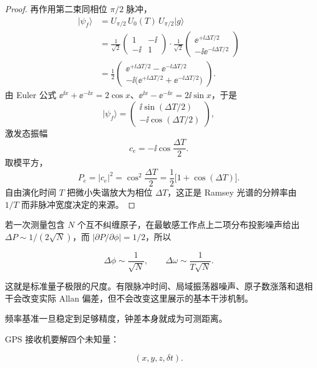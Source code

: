 \begin{proof}
再作用第二束同相位 $\pi/2$ 脉冲，
\begin{align*}
|\psi_f\rangle
&=U_{\pi/2}\,U_0(T)\,U_{\pi/2}|g\rangle \\
&=\frac1{\sqrt2}
\begin{pmatrix}1&-\ii\\-\ii&1\end{pmatrix}
\cdot\frac1{\sqrt2}
\begin{pmatrix}\ee^{+\ii\Delta T/2}\\-\ii\ee^{-\ii\Delta T/2}\end{pmatrix} \\
&=\frac12
\begin{pmatrix}
\ee^{+\ii\Delta T/2}-\ee^{-\ii\Delta T/2}\\
-\ii\bigl(\ee^{+\ii\Delta T/2}+\ee^{-\ii\Delta T/2}\bigr)
\end{pmatrix}.
\end{align*}
由 Euler 公式 $\ee^{\ii x}+\ee^{-\ii x}=2\cos x$、$\ee^{\ii x}-\ee^{-\ii x}=2\ii\sin x$，于是
\begin{equation*}
|\psi_f\rangle
=\begin{pmatrix}
\ii\sin(\Delta T/2)\\
-\ii\cos(\Delta T/2)
\end{pmatrix},
\end{equation*}
激发态振幅
\begin{equation*}
c_e=-\ii\cos\frac{\Delta T}{2}.
\end{equation*}
取模平方，
\begin{equation*}
P_e=|c_e|^2=\cos^2\frac{\Delta T}{2}
=\frac12\bigl[1+\cos(\Delta T)\bigr].
\end{equation*}
自由演化时间 $T$ 把微小失谐放大为相位 $\Delta T$，这正是 Ramsey 光谱的分辨率由 $1/T$ 而非脉冲宽度决定的来源。
\end{proof}

若一次测量包含 \(N\) 个互不纠缠原子，在最敏感工作点上二项分布投影噪声给出 \(\Delta P\sim1/(2\sqrt N)\)，而 \(|\partial P/\partial\phi|=1/2\)，所以

\[
\Delta\phi\sim\frac1{\sqrt N},
\qquad
\Delta\omega\sim\frac1{T\sqrt N}.
\]

这就是标准量子极限的尺度。有限脉冲时间、局域振荡器噪声、原子数涨落和退相干会改变实际 Allan 偏差，但不会改变这里展示的基本干涉机制。

频率基准一旦稳定到足够精度，钟差本身就成为可测距离。

GPS 接收机要解四个未知量：

\[
(x,y,z,\delta t).
\]

